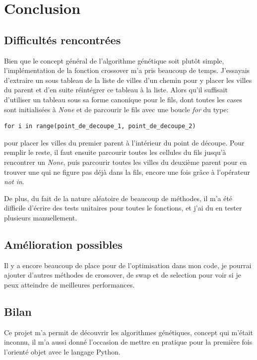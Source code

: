 \documentclass[12pt]{article}
\begin{document}
\section{Conclusion}

\subsection{Difficultés rencontrées}
Bien que le concept général de l'algorithme génétique soit plutôt simple, l'implémentation de la fonction crossover m'a pris beaucoup
de temps. J'essayais d'extraire un sous tableau de la liste de villes d'un chemin pour y placer les villes du parent et d'en suite réintégrer
ce tableau à la liste. Alors qu'il suffisait d'utiliser un tableau sous sa forme canonique pour le fils, dont toutes les cases sont initialisées à
\emph{None} et de parcourir le fils avec une boucle \emph{for} du type:
\begin{verbatim}
for i in range(point_de_decoupe_1, point_de_decoupe_2)
\end{verbatim}
pour placer les villes du premier parent à l'intérieur du point de découpe. Pour remplir le reste, il faut ensuite parcourir toutes les cellules du fils
jusqu'à rencontrer un \emph{None}, puis parcourir toutes les villes du deuxième parent pour en trouver une qui ne figure pas déjà dans la fils, encore
une fois grâce à l'opérateur \emph{not in}.

De plus, du fait de la nature aléatoire de beaucoup de méthodes, il m'a été difficile d'écrire des tests unitaires pour toutes le fonctions, et j'ai du
en tester plusieurs manuellement.

\subsection{Amélioration possibles}

Il y a encore beaucoup de place pour de l'optimisation dans mon code, je pourrai ajouter d'autres méthodes de crossover, de swap et de
selection pour voir si je peux atteindre de meilleures performances.

\subsection{Bilan}

Ce projet m'a permit de découvrir les algorithmes génétiques, concept qui m'était inconnu, il m'a aussi donné l'occasion de mettre en pratique pour la première
fois l'orienté objet avec le langage Python.
\end{document}
